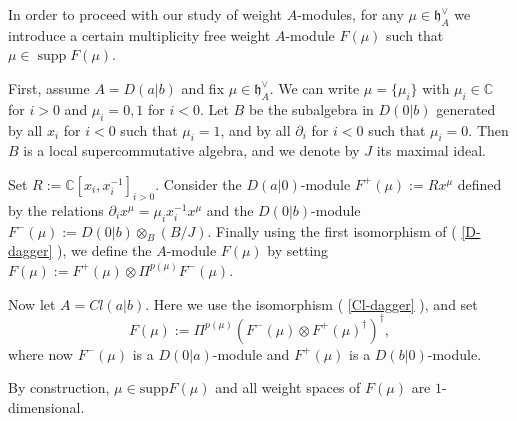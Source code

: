 \documentclass[12pt]{amsart}
\makeatletter
\def\@putname#1#2#3#4{\def\@@ref{#3}\let\old@bf\bf
        \def\bf##1{\old@bf\if?\noexpand##1?{#4}\else##1\fi}%
	#1{#2}%
        \let\bf\old@bf}
\def\@putname#1#2#3#4{\def\@@ref{#3}\let\old@bf\bf	%
	\let\old@reset@font\reset@font			%
        \def\bf##1{\old@bf\if?\noexpand##1?{#4}\else##1\fi}%
	\def\reset@font##1##2{\old@reset@font##1\if?\noexpand##2?{#4}\else##2\fi}#1{#2}%
        \let\bf\old@bf\let\reset@font\old@reset@font}
\let\my@ref=\ref
\def\ref#1{\@putname\my@ref{#1}{#1}{\tiny\rm\@@ref}}
\theoremstyle{plain} %
\numberwithin{equation}{section}
\theoremstyle{definition}
\theoremstyle{remark}
\theoremstyle{plain} %
\newcommand{\supp}{\mathrm{supp}}
\newcommand{\gh}{\mathfrak{h}}
\def\gh{\mathfrak{h}}
\makeatother
\begin{document}
In order to proceed with our study of  weight $A$-modules, for any $\mu \in \gh_A^{\vee}$ we  introduce a certain multiplicity free weight $A$-module $F(\mu)$ such that $\mu\in \operatorname{supp}F(\mu)$.

First, assume $A =D(a|b)$ and fix $\mu\in  \gh^{\vee}_A$. We can write $\mu=\{\mu_i\}$ with $\mu_i\in\mathbb C$ for $i>0$ and $\mu_i=0,1$ for $i<0$. Let $B$ be the subalgebra in $D(0|b)$ generated by all $x_i$ for  $i<0$ such that $\mu_i=1$,
and by all $\partial_i$ for  $i<0$ such that $\mu_i=0$. Then  $B$ is a local supercommutative  algebra, and we denote by $J$ its maximal ideal. 

Set
$R:=\mathbb C[x_i,x_i^{-1}]_{i>0}$. Consider the $D(a|0)$-module 
$F^+(\mu):=Rx^\mu$ defined by the relations $\partial_ix^\mu=\mu_ix_i^{-1}x^{\mu}$ and the $D(0|b)$-module $F^-(\mu):=D(0|b)\otimes_B(B/J)$. Finally using the first isomorphism of (\ref{D-dagger}), we define the $A$-module $F(\mu)$ by setting
$F(\mu):=F^+(\mu)\otimes \Pi^{p(\mu)} F^-(\mu)$.


Now let $A=Cl(a|b)$. Here we use the isomorphism (\ref{Cl-dagger}), and set
$$F(\mu):= \Pi^{p(\mu)} (F^-(\mu)\otimes F^+(\mu)^\dagger)^\dagger,$$
where now $F^-(\mu)$ is a $D(0|a)$-module  and  $F^+(\mu)$ is a $D(b|0)$-module.

By construction, $\mu\in\supp F(\mu)$ and all weight spaces of $F(\mu)$ are $1$-dimensional.
\end{document}
